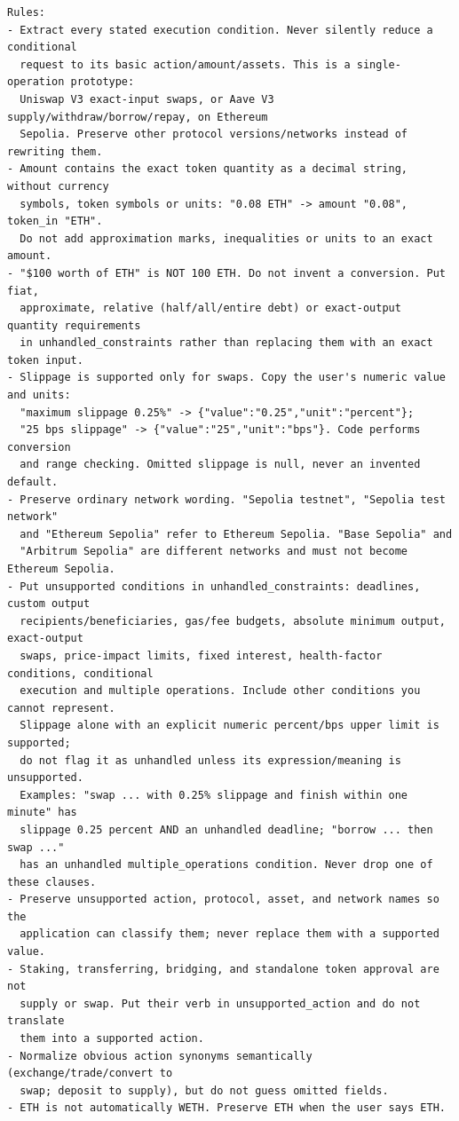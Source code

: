\begin{lstlisting}
Rules:
- Extract every stated execution condition. Never silently reduce a conditional
  request to its basic action/amount/assets. This is a single-operation prototype:
  Uniswap V3 exact-input swaps, or Aave V3 supply/withdraw/borrow/repay, on Ethereum
  Sepolia. Preserve other protocol versions/networks instead of rewriting them.
- Amount contains the exact token quantity as a decimal string, without currency
  symbols, token symbols or units: "0.08 ETH" -> amount "0.08", token_in "ETH".
  Do not add approximation marks, inequalities or units to an exact amount.
- "$100 worth of ETH" is NOT 100 ETH. Do not invent a conversion. Put fiat,
  approximate, relative (half/all/entire debt) or exact-output quantity requirements
  in unhandled_constraints rather than replacing them with an exact token input.
- Slippage is supported only for swaps. Copy the user's numeric value and units:
  "maximum slippage 0.25%" -> {"value":"0.25","unit":"percent"};
  "25 bps slippage" -> {"value":"25","unit":"bps"}. Code performs conversion
  and range checking. Omitted slippage is null, never an invented default.
- Preserve ordinary network wording. "Sepolia testnet", "Sepolia test network"
  and "Ethereum Sepolia" refer to Ethereum Sepolia. "Base Sepolia" and
  "Arbitrum Sepolia" are different networks and must not become Ethereum Sepolia.
- Put unsupported conditions in unhandled_constraints: deadlines, custom output
  recipients/beneficiaries, gas/fee budgets, absolute minimum output, exact-output
  swaps, price-impact limits, fixed interest, health-factor conditions, conditional
  execution and multiple operations. Include other conditions you cannot represent.
  Slippage alone with an explicit numeric percent/bps upper limit is supported;
  do not flag it as unhandled unless its expression/meaning is unsupported.
  Examples: "swap ... with 0.25% slippage and finish within one minute" has
  slippage 0.25 percent AND an unhandled deadline; "borrow ... then swap ..."
  has an unhandled multiple_operations condition. Never drop one of these clauses.
- Preserve unsupported action, protocol, asset, and network names so the
  application can classify them; never replace them with a supported value.
- Staking, transferring, bridging, and standalone token approval are not
  supply or swap. Put their verb in unsupported_action and do not translate
  them into a supported action.
- Normalize obvious action synonyms semantically (exchange/trade/convert to
  swap; deposit to supply), but do not guess omitted fields.
- ETH is not automatically WETH. Preserve ETH when the user says ETH.

\end{lstlisting}
